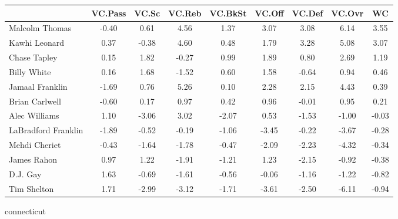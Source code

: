 \documentclass[10pt,letterpaper]{article}
\begin{document}
\begin{table}[ht]
\begin{center}
\begin{tabular}{lcccccccc}
  \hline
 & VC.Pass & VC.Sc & VC.Reb & VC.BkSt & VC.Off & VC.Def & VC.Ovr & WC \\ 
  \hline
Malcolm Thomas & -0.40 & 0.61 & 4.56 & 1.37 & 3.07 & 3.08 & 6.14 & 3.55 \\ 
  Kawhi Leonard & 0.37 & -0.38 & 4.60 & 0.48 & 1.79 & 3.28 & 5.08 & 3.07 \\ 
  Chase Tapley & 0.15 & 1.82 & -0.27 & 0.99 & 1.89 & 0.80 & 2.69 & 1.19 \\ 
  Billy White & 0.16 & 1.68 & -1.52 & 0.60 & 1.58 & -0.64 & 0.94 & 0.46 \\ 
  Jamaal Franklin & -1.69 & 0.76 & 5.26 & 0.10 & 2.28 & 2.15 & 4.43 & 0.39 \\ 
  Brian Carlwell & -0.60 & 0.17 & 0.97 & 0.42 & 0.96 & -0.01 & 0.95 & 0.21 \\ 
  Alec Williams & 1.10 & -3.06 & 3.02 & -2.07 & 0.53 & -1.53 & -1.00 & -0.03 \\ 
  LaBradford Franklin & -1.89 & -0.52 & -0.19 & -1.06 & -3.45 & -0.22 & -3.67 & -0.28 \\ 
  Mehdi Cheriet & -0.43 & -1.64 & -1.78 & -0.47 & -2.09 & -2.23 & -4.32 & -0.34 \\ 
  James Rahon & 0.97 & 1.22 & -1.91 & -1.21 & 1.23 & -2.15 & -0.92 & -0.38 \\ 
  D.J. Gay & 1.63 & -0.69 & -1.61 & -0.56 & -0.06 & -1.16 & -1.22 & -0.82 \\ 
  Tim Shelton & 1.71 & -2.99 & -3.12 & -1.71 & -3.61 & -2.50 & -6.11 & -0.94 \\ 
   \hline
\end{tabular}
\end{center}
\end{table}
\newpage
\begin{center}
connecticut 
\end{center}
\end{document}
